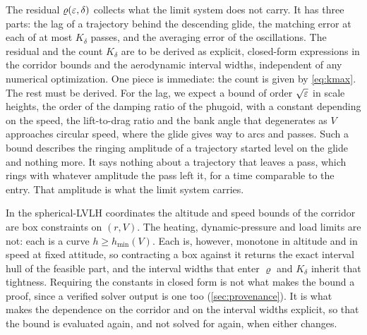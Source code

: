 \documentclass[english,11pt]{extarticle}
\begin{document}
The residual $\varrho(\varepsilon,\delta)$ collects what the limit system does not
carry. It has three parts: the lag of a trajectory behind the descending
glide, the matching error at each of at most $K_\delta$ passes, and the
averaging error of the oscillations. The residual and the count $K_\delta$
are to be derived as explicit, closed-form expressions in the corridor
bounds and the aerodynamic interval widths, independent of any numerical
optimization. One piece is immediate: the count is given by
\cref{eq:kmax}. The rest must be derived. For the lag, we expect a bound of
order $\sqrt{\varepsilon}$ in scale heights, the order of the damping ratio of the
phugoid, with a constant depending on the speed, the lift-to-drag ratio and
the bank angle that degenerates as $V$ approaches circular speed, where the
glide gives way to arcs and passes. Such a bound describes the ringing
amplitude of a trajectory started level on the glide and nothing more. It
says nothing about a trajectory that leaves a pass, which rings with
whatever amplitude the pass left it, for a time comparable to the entry.
That amplitude is what the limit system carries.

In the spherical-LVLH coordinates the altitude and speed bounds of the
corridor are box constraints on $(r,V)$. The heating, dynamic-pressure and
load limits are not: each is a curve $h \ge h_{\min}(V)$. Each is, however,
monotone in altitude and in speed at fixed attitude, so contracting a box
against it returns the exact interval hull of the feasible part, and the
interval widths that enter $\varrho$ and $K_\delta$ inherit that tightness.
Requiring the constants in closed form is not what makes the bound a proof,
since a verified solver output is one too (\cref{sec:provenance}). It is
what makes the dependence on the corridor and on the interval widths
explicit, so that the bound is evaluated again, and not solved for again,
when either changes.
\end{document}
